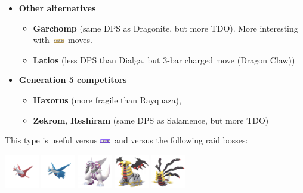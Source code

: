 \documentclass[12pt]{beamer}
\newcommand{\dragonfull}{\includegraphics[height=0.2cm]{../../images/type/full/Dragon.png}}
\newcommand{\groundfull}{\includegraphics[height=0.2cm]{../../images/type/full/Ground.png}}
\begin{document}
\begin{frame}[label=Dragon]
\begin{footnotesize}
\begin{block}{}
\begin{center}
\begin{itemize}
\item \textbf{Other alternatives}
\begin{itemize}
  \item \footnotesize \textbf{Garchomp} (same DPS as Dragonite, but more TDO). More interesting with~\groundfull~moves.
  \item \footnotesize \textbf{Latios} (less DPS than Dialga, but 3-bar charged move (Dragon Claw))
\end{itemize}
\item \textbf{Generation 5 competitors}
\begin{itemize}
  \item \footnotesize  \textbf{Haxorus} (more fragile than Rayquaza),
  \item \footnotesize \textbf{Zekrom}, \textbf{Reshiram} (same DPS as Salamence, but more TDO)
\end{itemize}
\end{itemize}
\end{center}
\end{block}

\begin{block}{}\begin{center}
This type is useful versus \dragonfull~and versus the following raid bosses:

    \includegraphics[width=1.5cm]{../../images/pokemon/latias.png}
    \includegraphics[width=1.5cm]{../../images/pokemon/latios.png}
    \includegraphics[width=1.5cm]{../../images/pokemon/palkia.png}\quad
    \includegraphics[width=1.5cm]{../../images/pokemon/giratina_a.png}\quad
    \includegraphics[width=1.5cm]{../../images/pokemon/giratina_o.png}
\end{center}
\end{block}

\end{footnotesize}
\end{frame}
\end{document}
